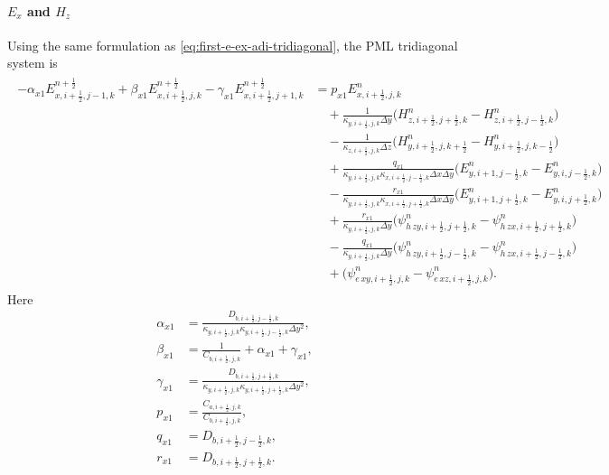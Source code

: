 \documentclass{article}
\numberwithin{equation}{section}
\numberwithin{figure}{section}
\begin{document}
\paragraph{$E_x$ and $H_z$}
Using the same formulation as \eqref{eq:first-e-ex-adi-tridiagonal}, the PML tridiagonal system is
\begin{align}
    \begin{split}
        -\alpha_{x1}E_{x,i+\tfrac12,j-1,k}^{n+\frac12} + \beta_{x1}E_{x,i+\tfrac12,j,k}^{n+\frac12} - \gamma_{x1}E_{x,i+\tfrac12,j+1,k}^{n+\frac12}
         & = p_{x1}E_{x,i+\tfrac12,j,k}^{n}                                                                                                                               \\
         & \quad +\frac{1}{\kappa_{y,i+\tfrac12,j,k}\Delta y}\Big(H_{z,i+\tfrac12,j+\tfrac12,k}^{n}-H_{z,i+\tfrac12,j-\tfrac12,k}^{n}\Big)                                \\
         & \quad -\frac{1}{\kappa_{z,i+\tfrac12,j,k}\Delta z}\Big(H_{y,i+\tfrac12,j,k+\tfrac12}^{n}-H_{y,i+\tfrac12,j,k-\tfrac12}^{n}\Big)                                \\
         & \quad +\frac{q_{x1}}{\kappa_{y,i+\tfrac12,j,k}\kappa_{x,i+\tfrac12,j-\tfrac12,k}\Delta x\Delta y}\Big(E_{y,i+1,j-\tfrac12,k}^{n}-E_{y,i,j-\tfrac12,k}^{n}\Big) \\
         & \quad -\frac{r_{x1}}{\kappa_{y,i+\tfrac12,j,k}\kappa_{x,i+\tfrac12,j+\tfrac12,k}\Delta x\Delta y}\Big(E_{y,i+1,j+\tfrac12,k}^{n}-E_{y,i,j+\tfrac12,k}^{n}\Big) \\
         & \quad +\frac{r_{x1}}{\kappa_{y,i+\tfrac12,j,k}\Delta y}\Big(\psi^{n}_{h\,zy,i+\tfrac12,j+\tfrac12,k} - \psi^{n}_{h\,zx,i+\tfrac12,j+\tfrac12,k}\Big)           \\
         & \quad -\frac{q_{x1}}{\kappa_{y,i+\tfrac12,j,k}\Delta y}\Big(\psi^{n}_{h\,zy,i+\tfrac12,j-\tfrac12,k} - \psi^{n}_{h\,zx,i+\tfrac12,j-\tfrac12,k}\Big)           \\
         & \quad +\Big(\psi^{n}_{e\,xy,i+\tfrac12,j,k}-\psi^{n}_{e\,xz,i+\tfrac12,j,k}\Big).
    \end{split}
    \label{eq:first-e-ex-pml-adi-tridiagonal}
\end{align}
Here
\begin{align}
    \alpha_{x1} & =\frac{D_{b,i+\tfrac12,j-\tfrac12,k}}{\kappa_{y,i+\tfrac12,j,k}\kappa_{y,i+\tfrac12,j-\tfrac12,k}\Delta y^2}, \\
    \beta_{x1}  & =\frac{1}{C_{b,i+\tfrac12,j,k}}+\alpha_{x1}+\gamma_{x1},                                                      \\
    \gamma_{x1} & =\frac{D_{b,i+\tfrac12,j+\tfrac12,k}}{\kappa_{y,i+\tfrac12,j,k}\kappa_{y,i+\tfrac12,j+\tfrac12,k}\Delta y^2}, \\
    p_{x1}      & =\frac{C_{a,i+\tfrac12,j,k}}{C_{b,i+\tfrac12,j,k}},                                                           \\
    q_{x1}      & =D_{b,i+\tfrac12,j-\tfrac12,k},                                                                               \\
    r_{x1}      & =D_{b,i+\tfrac12,j+\tfrac12,k}.
\end{align}
\end{document}
